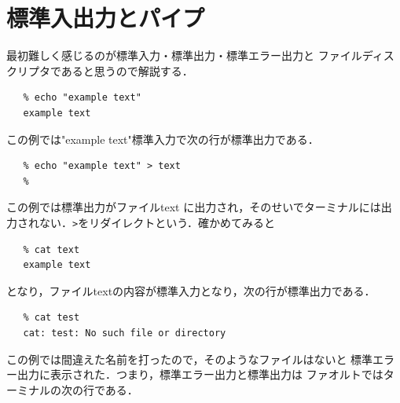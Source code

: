 %
%

\section{標準入出力とパイプ}
最初難しく感じるのが標準入力・標準出力・標準エラー出力と
ファイルディスクリプタであると思うので解説する．
\begin{verbatim}
   % echo "example text"
   example text
\end{verbatim}
この例では"example text"標準入力で次の行が標準出力である．
\begin{verbatim}
   % echo "example text" > text
   %
\end{verbatim}
この例では標準出力がファイルtext に出力され，そのせいでターミナルには出力されない．\verb/>/をリダイレクトという．確かめてみると
\begin{verbatim}
   % cat text
   example text
\end{verbatim}
となり，ファイルtextの内容が標準入力となり，次の行が標準出力である．
\begin{verbatim}
   % cat test
   cat: test: No such file or directory
\end{verbatim}
この例では間違えた名前を打ったので，そのようなファイルはないと
標準エラー出力に表示された．つまり，標準エラー出力と標準出力は
ファオルトではターミナルの次の行である．

